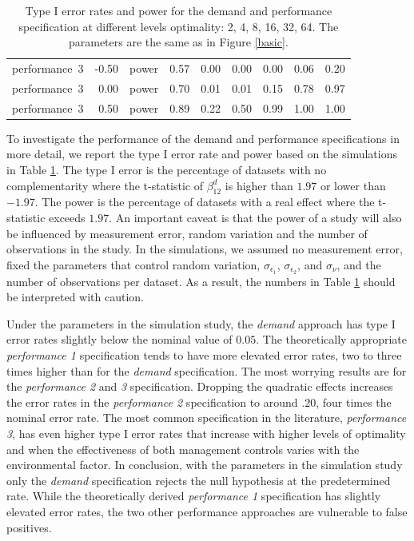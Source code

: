 \documentclass[12pt]{article}
\begin{document}
\begin{table}[ht]
\begin{tabular}{lrlrrrrrr}
  performance~3 & -0.50 & power & 0.57 & 0.00 & 0.00 & 0.00 & 0.06 & 0.20 \\
  performance~3 & 0.00 & power & 0.70 & 0.01 & 0.01 & 0.15 & 0.78 & 0.97 \\
  performance~3 & 0.50 & power & 0.89 & 0.22 & 0.50 & 0.99 & 1.00 & 1.00 \\
   \hline
\end{tabular}
\endgroup
\caption[Error Rate and Power of the Demand and Performance Specification]{Type I error rates and power for the demand and
performance specification at different levels optimality: 2, 4, 8,
16, 32, 64. The parameters are the same as in Figure \ref{basic}.}
\label{basic-error}
\end{table}

To investigate the performance of the demand and performance
specifications in more detail, we report the type I error rate and power
based on the simulations in Table \ref{basic-error}. The type I error is
the percentage of datasets with no complementarity where the t-statistic
of \(\beta^d_{12}\) is higher than \(1.97\) or lower than \(-1.97\). The
power is the percentage of datasets with a real effect where the
t-statistic exceeds \(1.97\). An important caveat is that the power of a
study will also be influenced by measurement error, random variation and
the number of observations in the study. In the simulations, we assumed
no measurement error, fixed the parameters that control random
variation, \(\sigma_{\epsilon_1}\), \(\sigma_{\epsilon_2}\), and
\(\sigma_{\nu}\), and the number of observations per dataset. As a
result, the numbers in Table \ref{basic-error} should be interpreted
with caution.

Under the parameters in the simulation study, the \emph{demand} approach
has type I error rates slightly below the nominal value of \(0.05\). The
theoretically appropriate \emph{performance 1} specification tends to
have more elevated error rates, two to three times higher than for the
\emph{demand} specification. The most worrying results are for the
\emph{performance 2} and \emph{3} specification. Dropping the quadratic
effects increases the error rates in the \emph{performance 2}
specification to around \(.20\), four times the nominal error rate. The
most common specification in the literature, \emph{performance 3}, has
even higher type I error rates that increase with higher levels of
optimality and when the effectiveness of both management controls varies
with the environmental factor. In conclusion, with the parameters in the
simulation study only the \emph{demand} specification rejects the null
hypothesis at the predetermined rate. While the theoretically derived
\emph{performance 1} specification has slightly elevated error rates,
the two other performance approaches are vulnerable to false positives.
\end{document}
